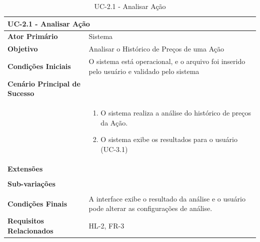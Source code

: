 \documentclass[12pt]{article}
\begin{document}
\begin{table}[H]
	\caption{UC-2.1 - Analisar Ação}
	\label{tab:UC-2.1}
	\begin{tabular}{p{6cm} p{8cm}}
		\multicolumn{2}{l}{\large{\textbf{UC-2.1 - Analisar Ação}}}\\
		\toprule
		\textbf{Ator Primário}		&	Sistema \\
		\midrule
		\textbf{Objetivo}			&	Analisar o Histórico de Preços de uma Ação \\
		\midrule
		\textbf{Condições Iniciais}	&	O sistema está operacional, e o arquivo foi inserido
										pelo usuário e validado pelo sistema\\
		\midrule
		\textbf{Cenário Principal de Sucesso}	& \\
		& \begin{enumerate}
			\item O sistema realiza a análise do histórico de preços da Ação.
			\item O sistema exibe os resultados para o usuário (UC-3.1)
		\end{enumerate}\\
		\midrule
		\textbf{Extensões}	& \\
		& \\
		\midrule
		\textbf{Sub-variações} & \\
		& \\
		\midrule
		\textbf{Condições Finais} & A interface exibe o resultado da análise e o usuário
									pode alterar as configurações de análise. \\
		\midrule
		\textbf{Requisitos Relacionados} & HL-2, FR-3 \\
		\bottomrule
	\end{tabular}		
\end{table}
\end{document}

